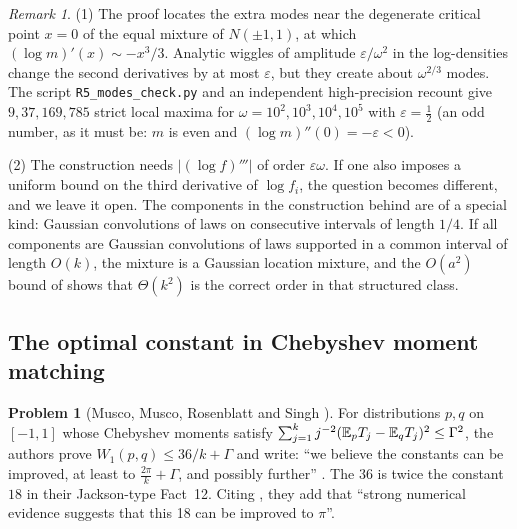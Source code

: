 \documentclass[11pt]{amsart}
\theoremstyle{definition}
\newtheorem{problem}[theorem]{Problem}
\theoremstyle{remark}
\newtheorem{remark}[theorem]{Remark}
\begin{document}
\begin{remark}\label{R5:rem:modes}
(1) The proof locates the extra modes near the degenerate critical point
$x=0$ of the equal mixture of $N(\pm1,1)$, at which
$(\log m)'(x)\sim-x^3/3$.  Analytic wiggles of amplitude
$\varepsilon/\omega^2$ in the log-densities change the second derivatives
by at most $\varepsilon$, but they create about $\omega^{2/3}$ modes.  The
script \texttt{R5\_\allowbreak{}modes\_\allowbreak{}check.py} and an independent high-precision recount give
$9,37,169,785$ strict local maxima for $\omega=10^2,10^3,10^4,10^5$ with
$\varepsilon=\frac12$ (an odd number, as it must be: $m$ is even and $(\log m)''(0)=-\varepsilon<0$).

(2) The construction needs $|(\log f)'''|$ of order $\varepsilon\omega$.  If
one also imposes a uniform bound on the third derivative of $\log f_i$, the
question becomes different, and we leave it open.  The components in the
construction behind \cite[Cor.~11]{R5-PW20} are of a special kind: Gaussian
convolutions of laws on consecutive intervals of length $1/4$.  If all
components are Gaussian convolutions of laws supported in a common interval
of length $O(k)$, the mixture is a Gaussian location mixture, and the
$O(a^2)$ bound of \cite[Sec.~5.4]{R5-PW20} shows that $\Theta(k^2)$ is the
correct order in that structured class.
\end{remark}

\subsection{The optimal constant in Chebyshev moment matching}
\label{R5:sec:favard}

\begin{problem}[Musco, Musco, Rosenblatt and Singh {\cite{R5-MMRS25}}]
\label{R5:prob:favard}
For distributions $p,q$ on $[-1,1]$ whose Chebyshev moments satisfy
$\sum_{j=1}^kj^{-2}(\mathbb{E}_pT_j-\mathbb{E}_qT_j)^2\le\Gamma^2$, the authors prove
$W_1(p,q)\le36/k+\Gamma$ and write: ``we believe the constants can be
improved, at least to $\frac{2\pi}{k}+\Gamma$, and possibly further''
\cite[footnote~3 and Sec.~3.1]{R5-MMRS25}.  The $36$ is twice the constant
$18$ in their Jackson-type Fact~12.  Citing \cite[App.~C.2]{R5-BKM22}, they
add that ``strong numerical evidence suggests that this 18 can be improved
to $\pi$''.
\end{problem}
\end{document}
